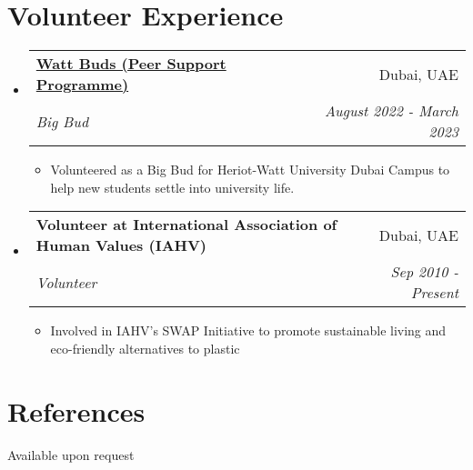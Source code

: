 \documentclass[a4paper,20pt]{article}
\makeatletter
\newcommand{\resumeItemWithoutTitle}[1]{
  \item\small{
	{#1 \vspace{-2pt}}
  }
}
\newcommand{\resumeSubheading}[4]{
  \vspace{-1pt}\item
	\begin{tabular*}{0.97\textwidth}{l@{\extracolsep{\fill}}r}
	  \textbf{#1} & #2 \\
	  \textit{#3} & \textit{#4} \\
	\end{tabular*}\vspace{-5pt}
}
\newcommand{\resumeSubHeadingListStart}{\begin{itemize}[leftmargin=*]}
\newcommand{\resumeSubHeadingListEnd}{\end{itemize}}
\newcommand{\resumeItemListStart}{\begin{itemize}}
\newcommand{\resumeItemListEnd}{\end{itemize}\vspace{-5pt}}
\makeatother
\begin{document}
\section{Volunteer Experience}
	\resumeSubHeadingListStart
		\resumeSubheading{\href{https://www.hw.ac.uk/uk/students/studies/wattbuds-dubai.htm}{Watt Buds (Peer Support Programme)}}{Dubai, UAE}
		{Big Bud}{August 2022 - March 2023}
			\resumeItemListStart
				\resumeItemWithoutTitle{Volunteered as a Big Bud for Heriot-Watt University Dubai Campus to help new students settle into university life.}
			\resumeItemListEnd
		\resumeSubheading{Volunteer at International Association of Human Values (IAHV)}{Dubai, UAE}
		{Volunteer}{Sep 2010 - Present}
			\resumeItemListStart
				\resumeItemWithoutTitle{Involved in IAHV's SWAP Initiative to promote sustainable living and eco-friendly alternatives to plastic}
			\resumeItemListEnd

\vspace{5pt}

	\resumeSubHeadingListEnd

\vspace{-5pt}
\section{References}
Available upon request
\end{document}
